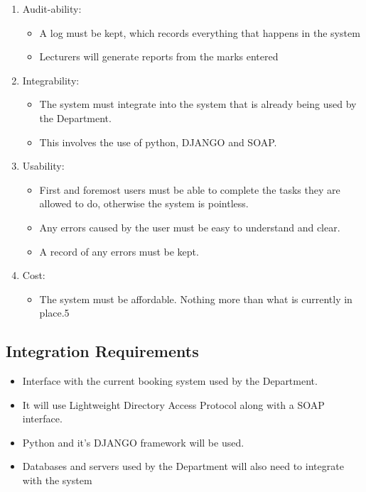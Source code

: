 \begin{enumerate}
\begin{itemize}
\end{itemize}
\item Audit-ability:
\begin{itemize}
\item A log must be kept, which records everything that happens in the system
\item Lecturers will generate reports from the marks entered
\end{itemize}
\item Integrability:
\begin{itemize}
\item The system must integrate into the system that is already being used by the Department.
\item This involves the use of python, DJANGO and SOAP.
\end{itemize}
\item Usability:
\begin{itemize}
\item First and foremost users must be able to complete the tasks they are allowed to do, otherwise the system is pointless.
\item Any errors caused by the user must be easy to understand and clear.
\item A record of any errors must be kept.
\end{itemize}
\item Cost:
\begin{itemize}
\item The system must be affordable. Nothing more than what is currently in place.5
\end{itemize}
\end{enumerate}

\subsection{Integration Requirements}

\begin{itemize}

\item Interface with the current booking system used by the Department.
\item It will use Lightweight Directory Access Protocol along with a SOAP interface.
\item Python and it's DJANGO framework will be used.
\item Databases and servers used by the Department will also need to integrate with the system 

\end{itemize}
